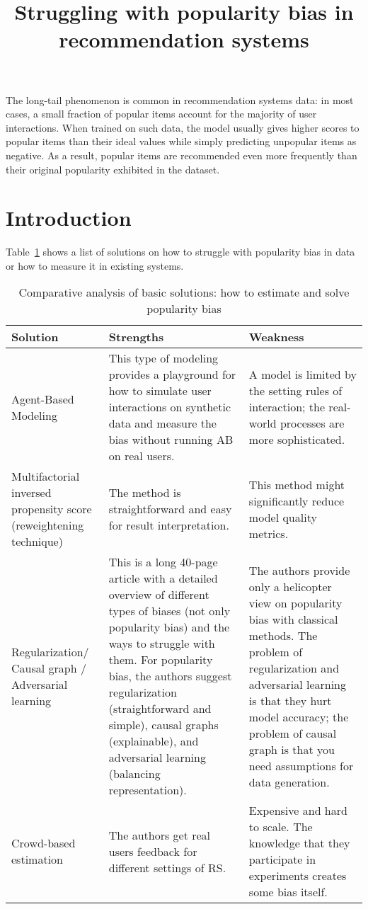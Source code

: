 \documentclass[12pt]{article}
\title{Struggling with popularity bias in recommendation systems}
\date{}
\begin{document}
\maketitle
The long-tail phenomenon is common in recommendation systems data: in most cases, a small fraction of popular items account for the majority of user interactions. When trained on such data, the model usually gives higher scores to popular items than their ideal values while simply predicting unpopular items as negative. As a result, popular items are recommended even more frequently than their original popularity exhibited in the dataset.

\section{Introduction}
Table~\ref{tab:intro_comparative} shows a list of solutions on how to struggle with popularity bias in data or how to measure it in existing systems.

\begin{table}[!!htbp]
\label{tab:intro_comparative}
\caption{Comparative analysis of basic solutions: how to estimate and solve popularity bias}
\begin{tabular}{p{5cm}|p{5cm}|p{5cm}}
Solution & Strengths & Weakness \\
\hline
Agent-Based Modeling~\cite{adomavicius2021understanding} & This type of modeling provides a playground for how to simulate user interactions on synthetic data and measure the bias without running AB on real users.
& A model is limited by the setting rules of interaction; the real-world processes are more sophisticated.
\\
\hline
Multifactorial inversed propensity score (reweightening technique) ~\cite{huang2024going} & The method is straightforward and easy for result interpretation.
& This method might significantly reduce model quality metrics.
\\
\hline
Regularization/ Causal graph / Adversarial learning
~\cite{chen2023bias} & This is a long 40-page article with a detailed overview of different types of biases (not only popularity bias) and the ways to struggle with them. For popularity bias, the authors suggest regularization (straightforward and simple), causal graphs (explainable), and adversarial learning (balancing representation).
& The authors provide only a helicopter view on popularity bias with classical methods. The problem of regularization and adversarial learning is that they hurt model accuracy; the problem of causal graph is that you need assumptions for data generation.
\\
\hline
Crowd-based estimation
~\cite{lesota2023computational} & The authors get real users feedback for different settings of RS.
& Expensive and hard to scale. The knowledge that they participate in experiments creates some bias itself.
\\
\end{tabular}
\end{table}

\nocite{*} %
\newpage


\end{document}
